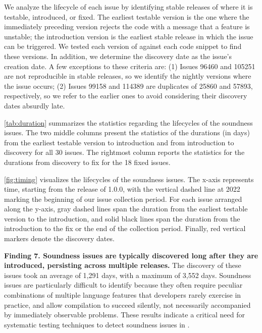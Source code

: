 We analyze the lifecycle of each issue by identifying stable releases of
\rustc{} where it is testable, introduced, or fixed.
%
The earliest testable version is the one where the immediately preceding version
rejects the code with a message that a feature is unstable;
%
the introduction version is the earliest stable release in which the issue can
be triggered.
%
We tested each version of \rustc{} against each code snippet to find these
versions.
%
In addition, we determine the discovery date as the issue's creation date.
%
A few exceptions to these criteria are:
%
(1) Issues 96460 and 105251 are not reproducible in stable releases, so we identify the
nightly versions where the issue occurs;
%
(2) Issues 99158 and 114389 are duplicates of 25860 and 57893, respectively, so
we refer to the earlier ones to avoid considering their discovery dates absurdly
late.

%
%
%

\cref{tab:duration} summarizes the statistics regarding the lifecycles of the
soundness issues.
%
The two middle columns present the statistics of the durations (in days) from
the earliest testable version to introduction and from introduction to discovery
for all 30 issues.
%
The rightmost column reports the statistics for the durations from discovery to
fix for the 18 fixed issues.

\cref{fig:timing} visualizes the lifecycles of the soundness issues.
%
The x-axis represents time, starting from the release of \rustc{} 1.0.0,
%
with the vertical dashed line at 2022 marking the beginning of our issue
collection period.
%
For each issue arranged along the y-axis, gray dashed lines span the duration
from the earliest testable version to the introduction,
%
and solid black lines span the duration from the introduction to the fix or the
end of the collection period.
%
Finally, red vertical markers denote the discovery dates.

{\bf Finding 7. Soundness issues are typically discovered long after they are
introduced, persisting across multiple releases.}
%
The discovery of these issues took an average of 1,291 days, with a maximum of
3,552 days.
%
Soundness issues are particularly difficult to identify because they often
require peculiar combinations of multiple language features that developers
rarely exercise in practice, and allow compilation to succeed silently, not
necessarily accompanied by immediately observable problems.
%
These results indicate a critical need for systematic testing techniques to
detect soundness issues in \rustc{}.

